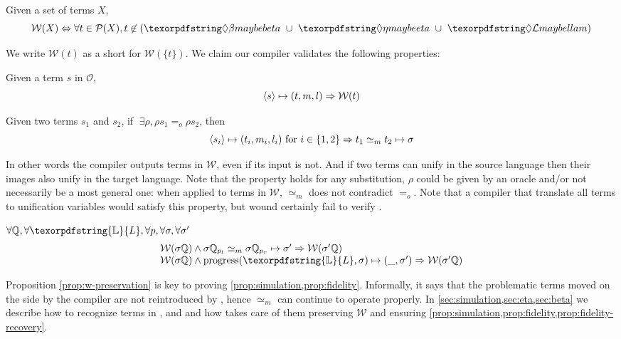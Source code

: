 \documentclass[sigconf,natbib=false,review]{acmart}
\newcommand{\EqualRel}{\ensuremath{=}}
\newcommand{\UnifRel}{\ensuremath{\simeq}}
\newcommand{\Eo}{\ensuremath{\EqualRel_o}\xspace}
\newcommand{\Ue}{\ensuremath{\UnifRel_m}\xspace}
\newcommand{\Fo}{\texorpdfstring{\ensuremath{\mathcal{O}\xspace}}{O}} %
\newcommand{\Ho}{\texorpdfstring{\ensuremath{\mathcal{M}}\xspace}{M}}
\newcommand{\linkStore}{\texorpdfstring{\ensuremath{\mathbb{L}}\xspace}{L}}
\newcommand{\hoUnifPb}{\ensuremath{\mathbb{Q}}\xspace}
\begin{document}
\newcommand{\wellb}{\ensuremath{\mathcal{W}}\xspace}
\begin{definition}
Given a set of terms $X$, %
$$
\wellb(X) \Leftrightarrow \forall t \in \subterm{X},
t \not\in (\maybebeta{} ~\cup~ \maybeeta{} ~\cup~ \notllambda{})
$$
\end{definition}

\noindent
We write $\wellb(t)$ as a short for $\wellb(\{t\})$.
We claim our compiler validates the following properties: 

\begin{proposition}[\wellb-enforcing]\label{prop:w-enforcing}
  Given a term $s$ in \Fo{}, 
  $$
    \C{s}{t}{m}{l} \Rightarrow \wellb(t)
  $$
\end{proposition}

\begin{proposition}\label{prop:w-noncontra}
  Given two terms $s_1$ and $s_2$, if $\;\exists \rho, \rho s_1 \Eo \rho s_2$,
  then 
  $$
    \C{s_i}{t_i}{m_i}{l_i} ~\mathrm{for}~ i \in \{ 1,2 \} \Rightarrow
    t_1 \Ue t_2 \mapsto \sigma \label{prop:compilation-w}
  $$
\end{proposition}

\noindent
In other words the compiler outputs terms in \wellb, even if its
input is not. And if two terms can unify in the source language
then their images also unify in the target language. 
Note that the property holds for any substitution, $\rho$ could be given by an
oracle and/or not necessarily be a most general one: when applied to terms in \wellb,
\Ue{} does not contradict \Eo. Note that a compiler that
translate all terms to unification variables would satisfy this
property, but wound certainly fail to verify .

\begin{proposition}[\wellb{}-preservation]\label{prop:w-preservation}
$\forall \hoUnifPb, \forall \linkStore, \forall p, \forall \sigma, \forall \sigma'$
$$
\begin{array}{l}
\wellb(\sigma\hoUnifPb) \land
  \sigma\hoUnifPb_{p_l} \Ue \sigma\hoUnifPb_{p_r} \mapsto {\sigma'}
  \Rightarrow \wellb(\sigma' \hoUnifPb)\\
\wellb(\sigma\hoUnifPb) \land
  \progress(\linkStore,\sigma) \mapsto (\_,\sigma')
  \Rightarrow \wellb(\sigma' \hoUnifPb)
\end{array}
$$
\end{proposition}

\noindent
Proposition \ref{prop:w-preservation} is key to proving \cref{prop:simulation,prop:fidelity}.
Informally, it says that the problematic terms moved on the side by the compiler
are not reintroduced by \hstep, hence \Ue{} can continue to operate properly.
In \cref{sec:simulation,sec:eta,sec:beta}
we describe how to %
recognize terms in \maybebeta, \maybeeta and
\notllambda and how \progress takes care of them preserving \wellb
and ensuring \cref{prop:simulation,prop:fidelity,prop:fidelity-recovery}.
\end{document}
